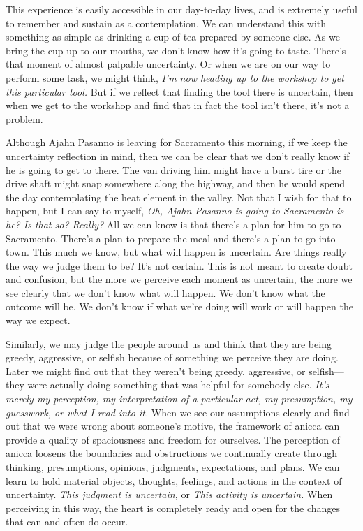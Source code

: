 This experience is easily accessible in our day-to-day lives, and is 
extremely useful to remember and sustain as a contemplation. We can 
understand this with something as simple as drinking a cup of tea 
prepared by someone else. As we bring the cup up to our mouths, we 
don't know how it's going to taste. There's that moment of almost 
palpable uncertainty. Or when we are on our way to perform some task, 
we might think, \emph{I'm now heading up to the workshop to get this 
particular tool.} But if we reflect that finding the tool there is 
uncertain, then when we get to the workshop and find that in fact the 
tool isn't there, it's not a problem.

Although Ajahn Pasanno is leaving for Sacramento this morning, if we 
keep the uncertainty reflection in mind, then we can be clear that we 
don't really know if he is going to get to there. The van driving him 
might have a burst tire or the drive shaft might snap somewhere along 
the highway, and then he would spend the day contemplating the heat 
element in the valley. Not that I wish for that to happen, but I can 
say to myself, \emph{Oh, Ajahn Pasanno is going to Sacramento is he? Is 
that so? Really?} All we can know is that there's a plan for him to go 
to Sacramento. There's a plan to prepare the meal and there's a plan to 
go into town. This much we know, but what will happen is uncertain. Are 
things really the way we judge them to be? It's not certain. This is 
not meant to create doubt and confusion, but the more we perceive each 
moment as uncertain, the more we see clearly that we don't know what 
will happen. We don't know what the outcome will be. We don't know if 
what we're doing will work or will happen the way we expect.

Similarly, we may judge the people around us and think that they are 
being greedy, aggressive, or selfish because of something we perceive 
they are doing. Later we might find out that they weren't being greedy, 
aggressive, or selfish---they were actually doing something that was 
helpful for somebody else. \emph{It's merely my perception, my 
interpretation of a particular act, my presumption, my guesswork, or 
what I read into it.} When we see our assumptions clearly and find out 
that we were wrong about someone's motive, the framework of anicca can 
provide a quality of spaciousness and freedom for ourselves. The 
perception of anicca loosens the boundaries and obstructions we 
continually create through thinking, presumptions, opinions, judgments, 
expectations, and plans. We can learn to hold material objects, 
thoughts, feelings, and actions in the context of uncertainty. 
\emph{This judgment is uncertain,} or \emph{This activity is 
uncertain.} When perceiving in this way, the heart is completely ready 
and open for the changes that can and often do occur.

